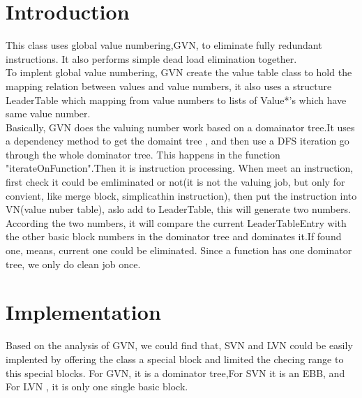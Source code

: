 


\label{Chapter1} %



\section{Introduction}

This class uses global value numbering,GVN, to eliminate fully
redundant instructions.  It also performs simple dead load
elimination together.\\
To implent global value numbering, GVN create the value table class
to  hold the mapping relation between values and value numbers, it also uses
a structure LeaderTable which mapping from value numbers to lists of Value*'s which
have same value number. 
\\
Basically, GVN does the valuing number work based on a
domainator tree.It uses a dependency method to get the domaint tree 
,  and then use a DFS iteration go through the whole dominator tree.
This happens in the function "iterateOnFunction".Then it is
instruction processing.
 When meet an instruction, first check it could be
emliminated  or not(it is not the valuing job, but only for
convient, like merge block, simplicathin instruction),
then put the instruction into VN(value nuber table),
aslo add to LeaderTable, this will generate two numbers.
According the two numbers, it will compare the current
LeaderTableEntry with the other basic block numbers in the 
dominator tree and dominates it.If found one, means, 
current one could be eliminated. Since a function has one
dominator tree, we only do clean job once.

\section{Implementation}
Based on the analysis of GVN, we could find that, SVN and LVN could
be easily implented by offering the class a special block and limited 
the checing range to this special blocks. For GVN, it is a dominator
tree,For SVN it is an EBB, and For LVN , it is only one single basic
block. 

